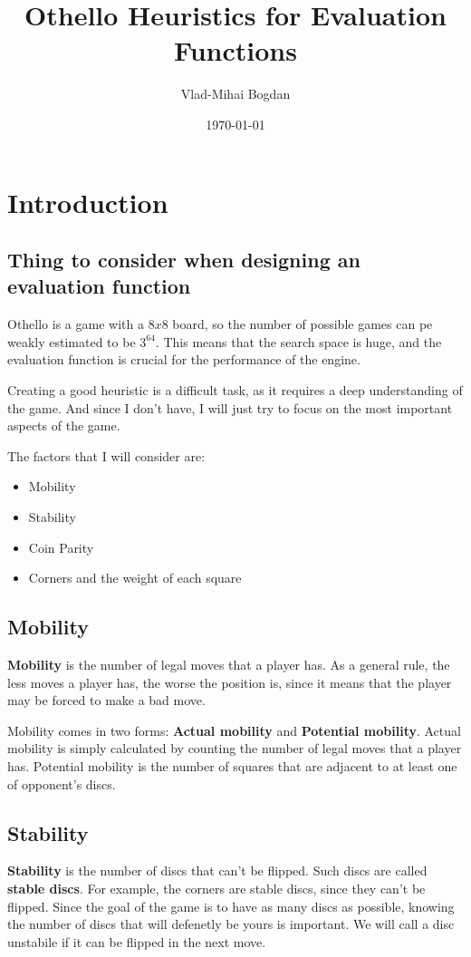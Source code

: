 \documentclass{article}
\title{Othello Heuristics for Evaluation Functions}
\author{Vlad-Mihai Bogdan}
\date{\today}
\begin{document}
\maketitle

\section*{Introduction}
\subsection*{Thing to consider when designing an evaluation function}

\quad Othello is a game with a $8 x 8$ board, so the number of possible games can pe weakly estimated to be $3^{64}$. 
This means that the search space is huge, and the evaluation function is crucial for the performance of the engine.

Creating a good heuristic is a difficult task, as it requires a deep understanding of the game. 
And since I don't have, I will just try to focus on the most important aspects of the game.

The factors that I will consider are:
\begin{itemize}
  \item Mobility
  \item Stability
  \item Coin Parity
  \item Corners and the weight of each square
\end{itemize}

\subsection*{Mobility}
\quad \textbf{Mobility} is the number of legal moves that a player has. 
As a general rule, the less moves a player has, the worse the position is, since it means that the player may be forced to make a bad move.

Mobility comes in two forms: \textbf{Actual mobility} and \textbf{Potential mobility}. 
Actual mobility is simply calculated by counting the number of legal moves that a player has.
Potential mobility is the number of squares that are adjacent to at least one of opponent's discs.

\subsection*{Stability}
\quad \textbf{Stability} is the number of discs that can't be flipped. 
Such discs are called \textbf{stable discs}. For example, the corners are stable discs, since they can't be flipped.
Since the goal of the game is to have as many discs as possible, knowing the number of discs that will defenetly be yours is important.
We will call a disc unstabile if it can be flipped in the next move. 
\end{document}
